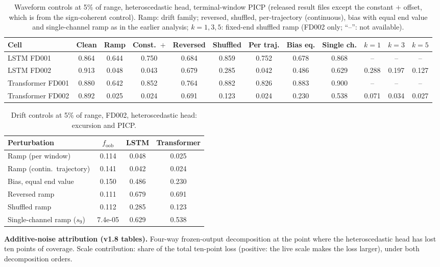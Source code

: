 \documentclass[10pt,a4paper]{article}
\begin{document}
\begin{table}[H]\centering\scriptsize
\caption{Waveform controls at 5\% of range, heteroscedastic head, terminal-window PICP (released result files except the constant $+$ offset, which is from the sign-coherent control). Ramp: drift family; reversed, shuffled, per-trajectory (continuous), bias with equal end value and single-channel ramp as in the earlier analysis; $k=1,3,5$: fixed-end shuffled ramp (FD002 only; ``--'': not available).}\label{tab:wf}
\begin{tabular}{lcccccccc|ccc}\toprule
Cell & Clean & Ramp & Const.\ $+$ & Reversed & Shuffled & Per traj. & Bias eq. & Single ch. & $k=1$ & $k=3$ & $k=5$ \\ \midrule
LSTM FD001 & 0.864 & 0.644 & 0.750 & 0.684 & 0.859 & 0.752 & 0.678 & 0.868 & -- & -- & -- \\
LSTM FD002 & 0.913 & 0.048 & 0.043 & 0.679 & 0.285 & 0.042 & 0.486 & 0.629 & 0.288 & 0.197 & 0.127 \\
Transformer FD001 & 0.880 & 0.642 & 0.852 & 0.764 & 0.882 & 0.826 & 0.883 & 0.900 & -- & -- & -- \\
Transformer FD002 & 0.892 & 0.025 & 0.024 & 0.691 & 0.123 & 0.024 & 0.230 & 0.538 & 0.071 & 0.034 & 0.027 \\
\bottomrule\end{tabular}
\end{table}
\begin{table}[H]\centering\footnotesize
\caption{Drift controls at 5\% of range, FD002, heteroscedastic head: excursion and PICP.}
\begin{tabular}{lccc}\toprule Perturbation & $f_{\mathrm{oob}}$ & LSTM & Transformer \\ \midrule
Ramp (per window) & 0.114 & 0.048 & 0.025 \\
Ramp (contin.\ trajectory) & 0.141 & 0.042 & 0.024 \\
Bias, equal end value & 0.150 & 0.486 & 0.230 \\
Reversed ramp & 0.111 & 0.679 & 0.691 \\
Shuffled ramp & 0.112 & 0.285 & 0.123 \\
Single-channel ramp ($s_9$) & 7.4e-05 & 0.629 & 0.538 \\
\bottomrule\end{tabular}
\end{table}
\noindent\textbf{Additive-noise attribution (v1.8 tables).} Four-way frozen-output decomposition at the point where the heteroscedastic head has lost ten points of coverage. Scale contribution: share of the total ten-point loss (positive: the live scale makes the loss larger), under both decomposition orders.
\end{document}
